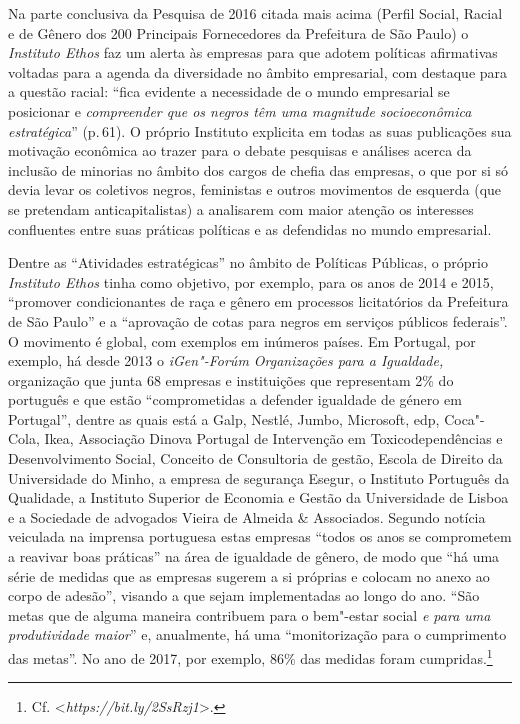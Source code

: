 Na parte conclusiva da Pesquisa de 2016 citada mais acima (Perfil
Social, Racial e de Gênero dos 200 Principais Fornecedores da Prefeitura
de São Paulo) o \emph{Instituto Ethos} faz um alerta às empresas para
que adotem políticas afirmativas voltadas para a agenda da diversidade
no âmbito empresarial, com destaque para a questão racial: ``fica
evidente a necessidade de o mundo empresarial se posicionar e
\emph{compreender que os negros têm uma magnitude socioeconômica
estratégica}'' (p.\,61). O próprio Instituto explicita em todas as suas
publicações sua motivação econômica ao trazer para o debate pesquisas e
análises acerca da inclusão de minorias no âmbito dos cargos de chefia
das empresas, o que por si só devia levar os coletivos negros,
feministas e outros movimentos de esquerda (que se pretendam
anticapitalistas) a analisarem com maior atenção os interesses
confluentes entre suas práticas políticas e as defendidas no mundo
empresarial.

Dentre as ``Atividades estratégicas'' no âmbito de Políticas Públicas, o
próprio \emph{Instituto Ethos} tinha como objetivo, por exemplo, para os
anos de 2014 e 2015, ``promover condicionantes de raça e gênero em
processos licitatórios da Prefeitura de São Paulo'' e a ``aprovação de
cotas para negros em serviços públicos federais''. O movimento é global,
com exemplos em inúmeros países. Em Portugal, por exemplo, há desde 2013
o \emph{iGen"-Forúm Organizações para a Igualdade,} organização que junta
68 empresas e instituições que representam 2\% do  português e que
estão ``comprometidas a defender igualdade de género em Portugal'',
dentre as quais está a Galp, Nestlé, Jumbo, Microsoft, edp, Coca"-Cola,
Ikea, Associação Dinova Portugal de Intervenção em Toxicodependências e
Desenvolvimento Social, Conceito de Consultoria de gestão, Escola de
Direito da Universidade do Minho, a empresa de segurança Esegur, o
Instituto Português da Qualidade, a Instituto Superior de Economia e
Gestão da Universidade de Lisboa e a Sociedade de advogados Vieira de
Almeida \& Associados. Segundo notícia veiculada na imprensa portuguesa
estas empresas ``todos os anos se comprometem a reavivar boas práticas''
na área de igualdade de gênero, de modo que ``há uma série de medidas
que as empresas sugerem a si próprias e colocam no anexo ao corpo de
adesão'', visando a que sejam implementadas ao longo do ano. ``São metas
que de alguma maneira contribuem para o bem"-estar social \emph{e para
uma produtividade maior}'' e, anualmente, há uma ``monitorização para o
cumprimento das metas''. No ano de 2017, por exemplo, 86\% das medidas
foram cumpridas.\footnote{Cf. \textless{}\emph{https://bit.ly/2SsRzj1}\textgreater{}.}

